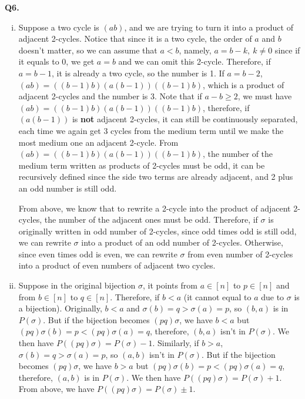\documentclass{article}[12pt]
\begin{document}
\noindent \textbf{Q6.}
\begin{enumerate}[(i)]
\item Suppose a two cycle is $(ab)$, and we are trying to turn it into a product of adjacent 2-cycles. Notice that since it is a two cycle, the order of $a$ and $b$ doesn't matter, so we can assume that $a<b$, namely, $a=b-k,\ k\not =0$ since if it equals to 0, we get $a=b$ and we can omit this 2-cycle. Therefore, if $a=b-1$, it is already a two cycle, so the number is 1. If $a=b-2$, $(ab)=((b-1)b)(a(b-1))((b-1)b)$, which is a product of adjacent 2-cycles and the number is 3. Note that if $a-b\geq 2$, we must have $(ab)=((b-1)b)(a(b-1))((b-1)b)$, therefore, if $(a(b-1))$ is \textbf{not} adjacent 2-cycles, it can still be continuously separated, each time we again get 3 cycles from the medium term until we make the most medium one an adjacent 2-cycle. From $(ab)=((b-1)b)(a(b-1))((b-1)b)$, the number of the medium term written as products of 2-cycles must be odd, it can be recursively defined since the side two terms are already adjacent, and 2 plus an odd number is still odd.
\par From above, we know that to rewrite a 2-cycle into the product of adjacent 2-cycles, the number of the adjacent ones must be odd. Therefore, if $\sigma$ is originally written in odd number of 2-cycles, since odd times odd is still odd, we can rewrite $\sigma$ into a product of an odd number of 2-cycles. Otherwise, since even times odd is even, we can rewrite $\sigma$ from even number of 2-cycles into a product of even numbers of adjacent two cycles.
\item Suppose in the original bijection $\sigma$, it points from $a\in [n]$ to $p\in [n]$ and from $b\in [n]$ to $q\in [n]$. Therefore, if $b<a$ (it cannot equal to $a$ due to $\sigma$ is a bijection). Originally, $b<a$ and $\sigma(b)=q>\sigma(a)=p$, so $(b,a)$ is in $P(\sigma)$. But if the bijection becomes $(pq)\sigma$, we have $b<a$ but $(pq)\sigma(b)=p<(pq)\sigma(a)=q$, therefore, $(b,a)$ isn't in $P(\sigma)$. We then have $P((p q) \sigma)=P(\sigma) - 1$. Similarly, if $b>a$, $\sigma(b)=q>\sigma(a)=p$, so $(a,b)$ isn't in $P(\sigma)$. But if the bijection becomes $(pq)\sigma$, we have $b>a$ but $(pq)\sigma(b)=p<(pq)\sigma(a)=q$, therefore, $(a,b)$ is in $P(\sigma)$. We then have $P((p q) \sigma)=P(\sigma) + 1$. From above, we have $P((p q) \sigma)=P(\sigma) \pm 1$.

\end{enumerate}
\end{document}
